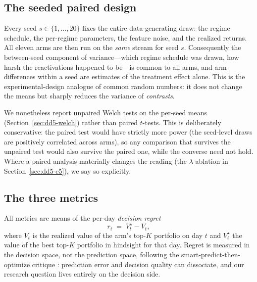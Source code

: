 \documentclass[11pt,a4paper]{article}
\theoremstyle{definition}
\theoremstyle{plain}
\begin{document}
\subsection{The seeded paired design}
\label{sec:dd5-paired}

Every seed $s \in \{1,\dots,20\}$ fixes the entire data-generating draw: the
regime schedule, the per-regime parameters, the feature noise, and the
realized returns. All eleven arms are then run on the \emph{same} stream for
seed $s$. Consequently the between-seed component of variance---which regime
schedule was drawn, how harsh the reactivations happened to be---is common to
all arms, and arm differences within a seed are estimates of the treatment
effect alone. This is the experimental-design analogue of common random
numbers: it does not change the means but sharply reduces the variance of
\emph{contrasts}.

We nonetheless report unpaired Welch tests on the per-seed means
(Section~\ref{sec:dd5-welch}) rather than paired $t$-tests. This is
deliberately conservative: the paired test would have strictly more power
(the seed-level draws are positively correlated across arms), so any
comparison that survives the unpaired test would also survive the paired one,
while the converse need not hold. Where a paired analysis materially changes
the reading (the $\lambda$ ablation in Section~\ref{sec:dd5-e5}), we say so
explicitly.

\subsection{The three metrics}
\label{sec:dd5-metrics}

All metrics are means of the per-day \emph{decision regret}
\[
r_t \;=\; V^{\star}_t - V_t,
\]
where $V_t$ is the realized value of the arm's top-$K$ portfolio on day $t$
and $V^{\star}_t$ the value of the best top-$K$ portfolio in hindsight for
that day. Regret is measured in the decision space, not the prediction space,
following the smart-predict-then-optimize critique
\citep{elmachtoub2022smart}: prediction error and decision quality can
dissociate, and our research question lives entirely on the decision side.
\end{document}
